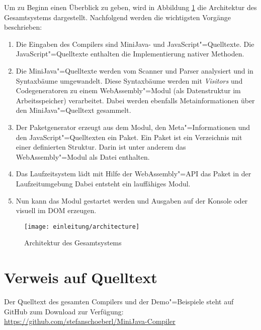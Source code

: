 Um zu Beginn einen Überblick zu geben, wird in Abbildung \ref{fig:architecture} die Architektur des Gesamtsystems dargestellt. Nachfolgend werden die wichtigsten Vorgänge beschrieben:

\begin{enumerate}
    \item Die Eingaben des Compilers sind MiniJava- und JavaScript"=Quelltexte. Die JavaScript"=Quelltexte enthalten die Implementierung nativer Methoden.
    \item Die MiniJava"=Quelltexte werden vom Scanner und Parser analysiert und in Syntaxbäume umgewandelt. Diese Syntaxbäume werden mit \emph{Visitors} und Codegeneratoren zu einem WebAssembly"=Modul (als Datenstruktur im Arbeitsspeicher) verarbeitet. Dabei werden ebenfalls Metainformationen über den MiniJava"=Quelltext gesammelt.
    \item Der Paketgenerator erzeugt aus dem Modul, den Meta"=Informationen und den JavaScript"=Quelltexten ein Paket. Ein Paket ist ein Verzeichnis mit einer definierten Struktur. Darin ist unter anderem das WebAssembly"=Modul als Datei enthalten.
    \item Das Laufzeitsystem lädt mit Hilfe der WebAssembly"=API das Paket in der Laufzeitumgebung Dabei entsteht ein lauffähiges Modul.
    \item Nun kann das Modul gestartet werden und Ausgaben auf der Konsole oder visuell im DOM erzeugen.
\end{enumerate}


\begin{figure}[]
    \centering
    \texttt{[image: einleitung/architecture]}
    \caption{Architektur des Gesamtsystems}
    \label{fig:architecture}
\end{figure}

\section{Verweis auf Quelltext}
Der Quelltext des gesamten Compilers und der Demo"=Beispiele steht auf GitHub zum Download zur Verfügung: \url{https://github.com/stefanschoeberl/MiniJava-Compiler}
